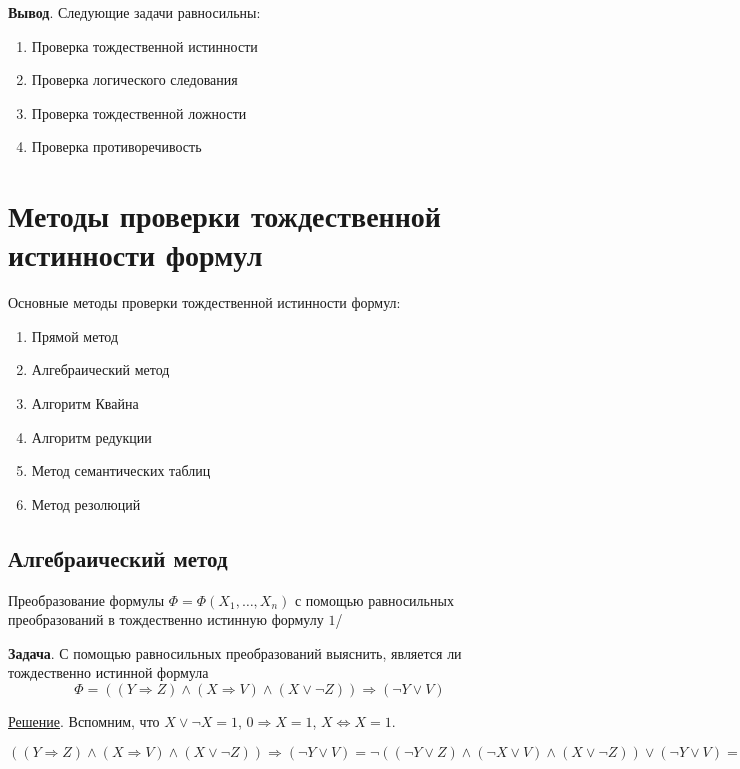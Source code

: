 \textbf{Вывод}. Следующие задачи равносильны:
\begin{enumerate}
    \item Проверка тождественной истинности
    \item Проверка логического следования
    \item Проверка тождественной ложности
    \item Проверка противоречивость
\end{enumerate}

\section{Методы проверки тождественной истинности формул}

Основные методы проверки тождественной истинности формул:
\begin{enumerate}
    \item Прямой метод
    \item Алгебраический метод
    \item Алгоритм Квайна
    \item Алгоритм редукции
    \item Метод семантических таблиц
    \item Метод резолюций
\end{enumerate}

\subsection{Алгебраический метод}
Преобразование формулы $\Phi = \Phi(X_1, \dots, X_n)$ с помощью равносильных преобразований в тождественно истинную формулу $1$/

\textbf{Задача}. С помощью равносильных преобразований выяснить, является ли тождественно истинной формула $$\Phi = ((Y \Rightarrow Z) \land (X \Rightarrow V) \land (X \lor \lnot Z)) \Rightarrow (\lnot Y \lor 
V)$$

\underline{Решение}. Вспомним, что $X \lor \lnot X = 1$, $0 \Rightarrow X = 1$, $X \Leftrightarrow X = 1$.

$((Y \Rightarrow Z) \land (X \Rightarrow V) \land (X \lor \lnot Z)) \Rightarrow (\lnot Y \lor V) = \lnot((\lnot Y \lor Z) \land (\lnot X \lor V) \land (X \lor \lnot Z)) \lor (\lnot Y \lor V) = ((Y \land \lnot Z) \lor (X \land \lnot V) \lor (\lnot X \land Z)) \lor \lnot Y \lor V = ((Y \lor \lnot Z) \lor \lnot Y( \lor ((X \land \lnot V) \lor V) \lor (\lnot X \land Z) = ((Y \lor \lnot Y) \land (\lnot Z \lor \lnot Y)) \lor ((X \lor V) \land (\lnot V \lor V)) \lor (\lnot X \land Z) = \lnot Z \lor \lnot Y \lor V \lor (X \lor (\lnot X \land Z)) = \lnot Z \lor \lnot Y \lor V \lor ((X \lor \lnot X) \land (X \lor Z)) = \lnot Z \lor \lnot Y \lor V \lor X \lor Z = \ = (Z \lor \lnot Z) \lor \lnot Y \lor V \lor X = 1 \lor \lnot Y \lor V \lor X = 1$

